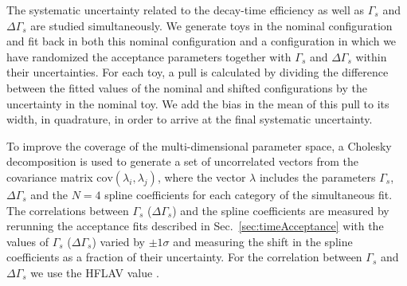 %
%



The systematic uncertainty related to the decay-time efficiency as well as
$\Gamma_s$ and $\Delta\Gamma_s$ are studied simultaneously.
We generate toys in the nominal configuration
and fit back in both this nominal configuration and a configuration in which we have
randomized the acceptance parameters together with $\Gamma_s$ and $\Delta\Gamma_s$ within their uncertainties.
For each toy, a pull is calculated by dividing the difference between the fitted values of the
nominal and shifted configurations by the uncertainty in the nominal toy. 
We add the bias in the mean of this pull to its width, in quadrature, in order to
arrive at the final systematic uncertainty.

To improve the coverage of the multi-dimensional parameter space, a Cholesky decomposition \cite{Golub:1996:MC:248979} is used to generate a set of uncorrelated vectors from the covariance matrix $\text{cov}(\lambda_i,\lambda_j)$, where the vector $\lambda$ includes the parameters $\Gamma_s$, $\Delta\Gamma_s$ and the $N=4$ spline coefficients for each category of the simultaneous fit.
The correlations between $\Gamma_s$ ($\Delta\Gamma_s$) and the spline coefficients are measured by rerunning the acceptance fits described in Sec.~\ref{sec:timeAcceptance} 
with the values of $\Gamma_s$ ($\Delta\Gamma_s$) varied by $\pm 1\sigma$ and measuring the shift in the spline coefficients as a fraction of
their uncertainty. 
For the correlation between $\Gamma_s$ and $\Delta\Gamma_s$ we use the HFLAV value \cite{HFAG}.

